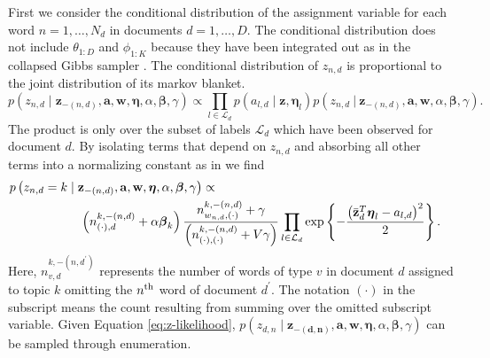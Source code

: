 First we consider the conditional distribution of the assignment variable
for each word $n=1,\ldots,N_{d}$ in documents $d=1,\ldots,D$. The
conditional distribution does not include $\theta_{1:D}$ and $\phi_{1:K}$
because they have been integrated out as in the collapsed Gibbs sampler
\citep{Griffiths04}. The conditional distribution of $z_{n,d}$ is
proportional to the joint distribution of its markov blanket. %
\begin{equation}
p\left(z_{n,d}\mid\mathbf{z}_{-\left(n,d\right)},\mathbf{a},\mathbf{w},\mathbf{\boldsymbol\eta},\alpha,\boldsymbol\beta,\gamma\right)\propto\prod_{l\in\mathcal{L}_{d}}p\left(a_{l,d}\mid\mathbf{z},\boldsymbol\eta_{l}\right)p\left(z_{n,d}\ |\ \mathbf{z}_{-\left(n,d\right)},\mathbf{a},\mathbf{w},\alpha,\boldsymbol\beta,\gamma\right).\end{equation}
 The product is only over the subset of labels $\mathcal{L}_{d}$
which have been observed for document $d$. By isolating terms that
depend on $z_{n,d}$ and absorbing all other terms into a normalizing
constant as in \citep{Griffiths04} we find 
\begin{eqnarray}
\lefteqn{p\left(z_{n,d}=k\mid\mathbf{z}_{-\left(n,d\right)},\mathbf{a},\mathbf{w},\mathbf{\boldsymbol\eta},\alpha,\boldsymbol\beta,\gamma\right)\propto}\nonumber \\
 & \hspace{2cm}\left(n_{\left(\cdot\right),d}^{k,-\left(n,d\right)}+\alpha\boldsymbol\beta_{k}\right)\frac{n_{w_{n,d},\left(\cdot\right)}^{k,-\left(n,d\right)}+\gamma}{\left(n_{\left(\cdot\right),\left(\cdot\right)}^{k,-\left(n,d\right)}+V\gamma\right)}\prod_{l\in\mathcal{L}_{d}}\exp\left\{ -\frac{\left(\bar{\mathbf{z}}_{d}^{T}\boldsymbol\eta_{l}-a_{l,d}\right)^{2}}{2}\right\} .\label{eq:z-likelihood}\end{eqnarray}
 Here, $n_{v,d}^{k,-\left(n,d^{\prime}\right)}$ represents the number
of words of type $v$ in document $d$ assigned to topic $k$ omitting
the $n^{{\rm th}}$ word of document $d^{\prime}$. The notation $(\cdot)$
in the subscript means the count resulting from summing over the omitted
subscript variable. Given Equation \ref{eq:z-likelihood}, $p\left(z_{d,n}\mid\mathbf{z_{-\left(d,n\right)}},\mathbf{a},\mathbf{w},\mathbf{\boldsymbol\eta},\alpha,\boldsymbol\beta,\gamma\right)$
can be sampled through enumeration. 


